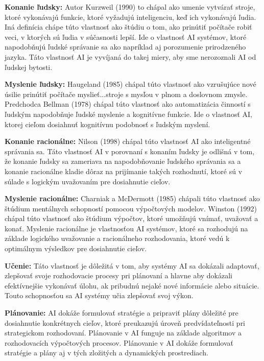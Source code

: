 \par \textbf{Konanie ľudsky:}  Autor Kurzweil (1990) to chápal ako umenie vytvárať stroje, ktoré vykonávajú funkcie, ktoré vyžadujú inteligenciu, keď ich vykonávajú ľudia. \cite{ayca2019} Iná definícia chápe túto vlastnosť ako štúdiu o tom, ako prinútiť počítače robiť veci, v ktorých sú ľudia v súčasnosti lepší. \cite{ayca2019} Ide o vlastnosť AI systémov, ktoré napodobňujú ľudské správanie sa ako napríklad aj porozumenie prirodzeného jazyka. Táto vlastnosť AI je vyvíjaná do takej miery, aby sme nerozoznali AI od ľudskej bytosti. 
 \\
\par \textbf{Myslenie ľudsky:} Haugeland (1985) chápal túto vlastnosť ako vzrušujúce nové úsilie prinútiť počítače myslieť...stroje s mysľou v plnom a doslovnom zmysle. \cite{ayca2019} Predchodca Bellman (1978) chápal túto vlastnosť ako automatizácia činností s ľudským napodobňuje ľudské myslenie a kognitívne funkcie. Ide o vlastnosť AI, ktorej cieľom dosiahnuť kognitívnu podobnosť s ľudským myslení.
 \\
\par \textbf{Konanie racionálne:} Nilson (1998) chápal túto vlastnosť AI ako inteligentné správania sa. \cite{ayca2019} Táto vlastnosť AI v porovnaní s konaním ľudsky je odlišná v tom, že konanie ľudsky sa zameriava na napodobňovanie ľudského správania sa a konanie racionálne kladie dôraz na prijímanie takých rozhodnutí, ktoré sú v súlade s logickým uvažovaním pre dosiahnutie cieľov.
 \\
\par \textbf{Myslenie racionálne:} Charniak a McDermott (1985) chápali túto vlastnosť ako štúdium mentálnych schopností pomocou výpočtových modelov. \cite{ayca2019} Winston (1992) chápal túto vlastnosť ako štúdium výpočtov, ktoré umožňujú vnímať, uvažovať a konať. \cite{ayca2019} Myslenie racionálne je vlastnosťou AI systémov, ktoré sa rozhodujú na základe logického uvažovanie a racionálneho rozhodovania, ktoré vedú k optimálnym výsledkov pre dosiahnutie cieľov.
 \\
\par \textbf{Učenie:} Táto vlastnosť je dôležitá v tom, aby systémy AI sa dokázali adaptovať, zlepšovať svoje rozhodovacie procesy pri plánovaní a hlavne aby dokázali efektívnejšie vykonávať úlohu, ak pribudnú nejaké nové informácie alebo situácie. Touto schopnosťou sa AI systémy učia zlepšovať svoj výkon.
 \\
\par \textbf{Plánovanie:} AI dokáže formulovať stratégie a pripraviť plány dôležité pre dosiahnutie konkrétnych cieľov, ktoré preukazujú úroveň predvídateľnosti pri strategickom rozhodovaní. Plánovanie v AI funguje na základe algoritmov a rozhodovacích výpočtových procesov. Plánovanie v AI dokáže formulovať stratégie a plány aj v tých zložitých a dynamických prostrediach.

